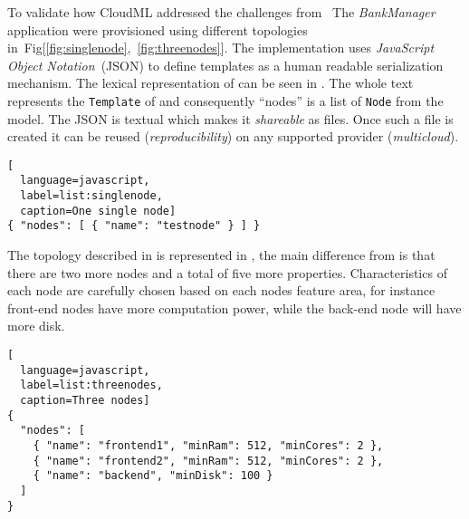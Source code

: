 



To validate how CloudML addressed the challenges from~
The \emph{BankManager} application were provisioned using different topologies in~Fig[\ref{fig:singlenode},~\ref{fig:threenodes}].
The implementation uses \emph{JavaScript Object Notation}~(JSON) to define templates
as a human readable serialization mechanism.
The lexical representation of  can be seen in . 
The whole text represents the \texttt{Template} of  and consequently 
``nodes'' is a list of \texttt{Node} from the model.
The JSON is textual which makes it \emph{shareable} as files.
Once such a file is created it can be reused (\emph{reproducibility}) 
on any supported provider (\emph{multicloud}).

\begin{lstlisting}[
  language=javascript,
  label=list:singlenode,
  caption=One single node]
{ "nodes": [ { "name": "testnode" } ] }
\end{lstlisting}

The topology described in  is represented in ,
the main difference from  is that there are two more nodes and a total of 
five more properties.
Characteristics of each node are carefully chosen based on each nodes feature area, for instance 
front-end nodes have more computation power, while the back-end node will have more disk.

\begin{lstlisting}[
  language=javascript,
  label=list:threenodes,
  caption=Three nodes]
{
  "nodes": [ 
    { "name": "frontend1", "minRam": 512, "minCores": 2 },
    { "name": "frontend2", "minRam": 512, "minCores": 2 },
    { "name": "backend", "minDisk": 100 }
  ]
}
\end{lstlisting}
